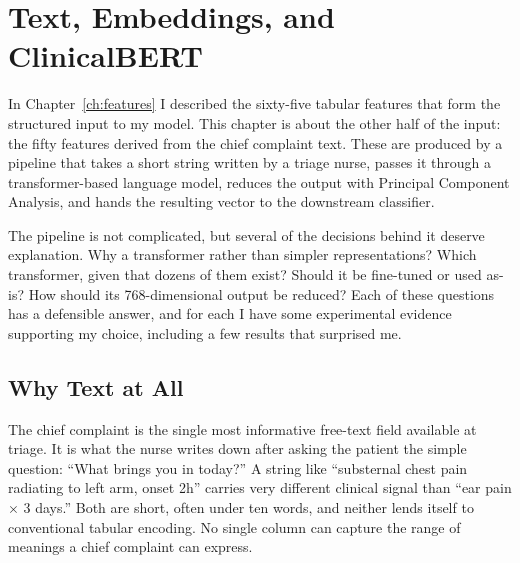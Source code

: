 
\chapter{Text, Embeddings, and ClinicalBERT}
\label{ch:embeddings}

In Chapter~\ref{ch:features} I described the sixty-five tabular features that form the structured input to my model. This chapter is about the other half of the input: the fifty features derived from the chief complaint text. These are produced by a pipeline that takes a short string written by a triage nurse, passes it through a transformer-based language model, reduces the output with Principal Component Analysis, and hands the resulting vector to the downstream classifier.

The pipeline is not complicated, but several of the decisions behind it deserve explanation. Why a transformer rather than simpler representations? Which transformer, given that dozens of them exist? Should it be fine-tuned or used as-is? How should its 768-dimensional output be reduced? Each of these questions has a defensible answer, and for each I have some experimental evidence supporting my choice, including a few results that surprised me.

\section{Why Text at All}

The chief complaint is the single most informative free-text field available at triage. It is what the nurse writes down after asking the patient the simple question: ``What brings you in today?'' A string like ``substernal chest pain radiating to left arm, onset 2h'' carries very different clinical signal than ``ear pain $\times$ 3 days.'' Both are short, often under ten words, and neither lends itself to conventional tabular encoding. No single column can capture the range of meanings a chief complaint can express.

